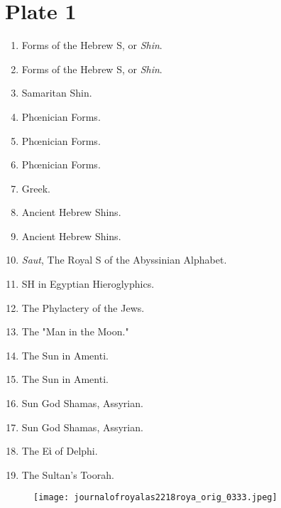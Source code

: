 \documentclass[a4paper, 11pt, oneside, english]{article}
\begin{document}
\section*{Plate 1}
\begin{enumerate}
    \item Forms of the Hebrew S, or \emph{Shin}.

    \item Forms of the Hebrew S, or \emph{Shin}.

    \item Samaritan Shin.

    \item Phœnician Forms.

    \item Phœnician Forms.

    \item Phœnician Forms.

    \item Greek.

    \item Ancient Hebrew Shins.

    \item Ancient Hebrew Shins.

    \item \emph{Saut}, The Royal S of the Abyssinian Alphabet.

    \item SH in Egyptian Hieroglyphics.

    \item The Phylactery of the Jews.

    \item The "Man in the Moon."

    \item The Sun in Amenti.

    \item The Sun in Amenti.

    \item Sun God Shamas, Assyrian.

    \item Sun God Shamas, Assyrian.

    \item The Εὶ of Delphi.

    \item The Sultan's Toorah.
\end{enumerate}
\vspace*{\fill}  
\clearpage
\vspace*{\fill}  
\begin{figure}[H]
\centering
\texttt{[image: journalofroyalas2218roya\_orig\_0333.jpeg]}
\end{figure}
\vspace*{\fill} 
\clearpage
\vspace*{\fill}  
\end{document}
